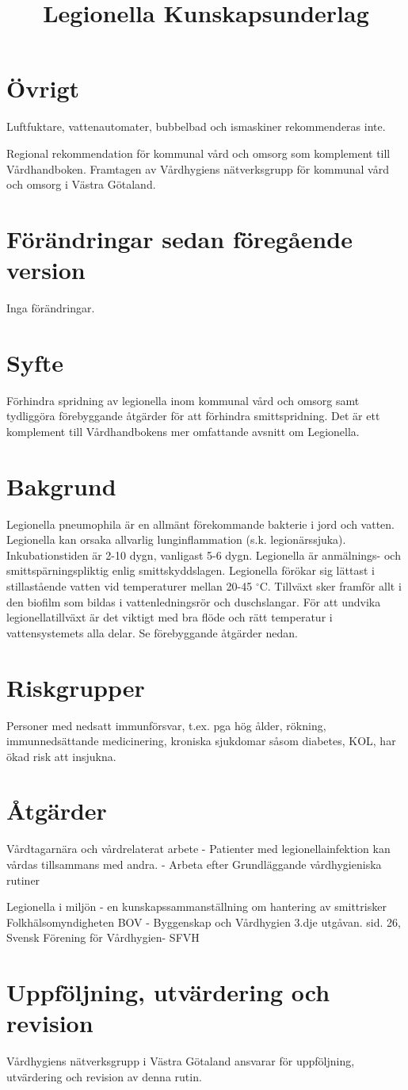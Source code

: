 \section*{Övrigt}
Luftfuktare, vattenautomater, bubbelbad och ismaskiner rekommenderas inte.

\title{
Legionella
}
Regional rekommendation för kommunal vård och omsorg som komplement till Vårdhandboken. Framtagen av Vårdhygiens nätverksgrupp för kommunal vård och omsorg i Västra Götaland.
\section*{Förändringar sedan föregående version}
Inga förändringar.
\section*{Syfte}
Förhindra spridning av legionella inom kommunal vård och omsorg samt tydliggöra förebyggande åtgärder för att förhindra smittspridning. Det är ett komplement till Vårdhandbokens mer omfattande avsnitt om Legionella.
\section*{Bakgrund}
Legionella pneumophila är en allmänt förekommande bakterie i jord och vatten.
Legionella kan orsaka allvarlig lunginflammation (s.k. legionärssjuka).
Inkubationstiden är 2-10 dygn, vanligast 5-6 dygn. Legionella är anmälnings- och smittspärningspliktig enlig smittskyddslagen.
Legionella förökar sig lättast i stillastående vatten vid temperaturer mellan 20-45 \({ }^{\circ} \mathrm{C}\). Tillväxt sker framför allt i den biofilm som bildas i vattenledningsrör och duschslangar. För att undvika legionellatillväxt är det viktigt med bra flöde och rätt temperatur i vattensystemets alla delar. Se förebyggande åtgärder nedan.
\section*{Riskgrupper}
Personer med nedsatt immunförsvar, t.ex. pga hög ålder, rökning, immunnedsättande medicinering, kroniska sjukdomar såsom diabetes, KOL, har ökad risk att insjukna.
\section*{Åtgärder}
Vårdtagarnära och vårdrelaterat arbete
- Patienter med legionellainfektion kan vårdas tillsammans med andra.
- Arbeta efter Grundläggande vårdhygieniska rutiner

\title{
Kunskapsunderlag
}
Legionella i miljön - en kunskapssammanställning om hantering av smittrisker Folkhälsomyndigheten
BOV - Byggenskap och Vårdhygien 3.dje utgåvan. sid. 26, Svensk Förening för Vårdhygien- SFVH
\section*{Uppföljning, utvärdering och revision}
Vårdhygiens nätverksgrupp i Västra Götaland ansvarar för uppföljning, utvärdering och revision av denna rutin.